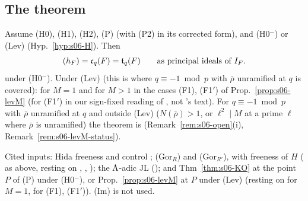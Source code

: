 \subsection{The theorem}
\begin{theorem}\label{thm:s06-defect}
Assume (H0), (H1), (H2), (P) (with (P2) in its corrected form), and (H0$^-$) or (Lev) (Hyp.~\ref{hyp:s06-H}). Then
\[(h_F)=\mathfrak{c}_q(F)=\mathfrak{t}_q(F)\qquad\text{as principal ideals of }I_F.\]
\stpmc{} under (H0$^-$). Under (Lev) (this is where $q\equiv-1\bmod p$ with $\bar\rho$ unramified at $q$ is covered): \stpmc{} for $M=1$
and for $M>1$ in the cases (F1), (F1$'$) of Prop.~\ref{prop:s06-levM} (for (F1$'$) in our sign-fixed reading of \cite[Thm~3.14]{KO}, not
\cite{KO}'s text). For $q\equiv-1\bmod p$ with $\bar\rho$ unramified at $q$ and outside (Lev) ($N(\bar\rho)>1$, or $\ell^2\mid M$ at a prime $\ell$ where $\bar\rho$ is unramified) the theorem is \stopen{} (Remark~\ref{rem:s06-open}(i), Remark~\ref{rem:s06-levM-status}).

 Cited inputs: Hida freeness
and control \cite[Thm~3.1, Cor.~3.2]{Hi86b} ; (Gor$_R$) and (Gor$_{R'}$), with freeness of $H$ (\cite{Hs} as above, resting on \cite{Wi95}, \cite{MW86}, \cite[Cor.~8.11]{Hel}
); the $\Lambda$-adic JL
(); and Thm~\ref{thm:s06-KO} at the point $P$ of (P) under (H0$^-$), or Prop.~\ref{prop:s06-levM} at $P$ under
(Lev) (resting on \cite[Thm~2.9, Lemma~2.4]{KO} for $M=1$, \cite[Thm~3.14]{KO} for (F1), (F1$'$)). (Im) is not used.
\end{theorem}
